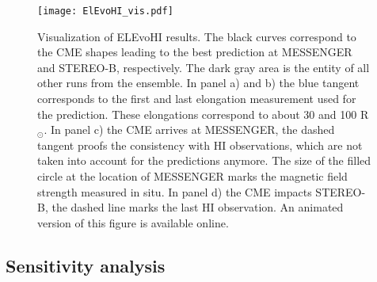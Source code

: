 \documentclass[draft]{agujournal}
\begin{document}

\begin{figure}[h]
\centering
\texttt{[image: ElEvoHI\_vis.pdf]}
\caption{Visualization of ELEvoHI results. The black curves correspond to the CME shapes leading to the best prediction at MESSENGER and STEREO-B, respectively. The dark gray area is the entity of all other runs from the ensemble. In panel a) and b) the blue tangent corresponds to the first and last elongation measurement used for the prediction. These elongations correspond to about 30 and 100 R$_\odot$. In panel c) the CME arrives at MESSENGER, the dashed tangent proofs the consistency with HI observations, which are not taken into account for the predictions anymore. The size of the filled circle at the location of MESSENGER marks the magnetic field strength measured in situ. In panel d) the CME impacts STEREO-B, the dashed line marks the last HI observation. An animated version of this figure is available online.}
\label{fig:elevohi}
\end{figure}

\subsection{Sensitivity analysis}
\end{document}
